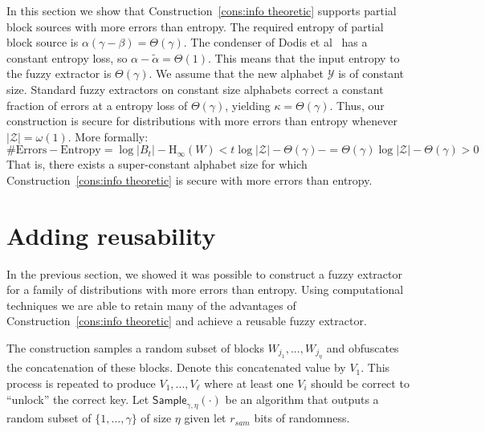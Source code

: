 \documentclass[11pt]{article}
\newcommand{\consref}[1]{\mbox{Construction~\ref{#1}}}
\newcommand{\class}[1]{{\ensuremath{\mathsf{#1}}}}
\newcommand{\sample}{\ensuremath{\class{Sample}}\xspace}
\newcommand{\Hoo}{\mathrm{H}_\infty}
\begin{document}
In this section we show that \consref{cons:info theoretic} supports partial block sources with more errors than entropy.  The required entropy of partial block source is $\alpha (\gamma-\beta ) = \Theta(\gamma)$.  The condenser of Dodis et al~\cite{dodis2014key} has a constant entropy loss, so $\alpha-\tilde{\alpha} = \Theta(1)$. This means that the input entropy to the fuzzy extractor is $\Theta(\gamma)$.   We assume that the new alphabet $\mathcal{Y}$ is of constant size.  Standard fuzzy extractors on constant size alphabets correct a constant fraction of errors at a entropy loss of $\Theta(\gamma)$, yielding $\kappa = \Theta(\gamma)$.  Thus, our construction is secure for distributions with more errors than entropy whenever $|\mathcal{Z}| = \omega(1)$.
More formally:
\[
\text{\# Errors} - \text{Entropy} = \log |B_t| - \Hoo(W) <  t \log |\mathcal{Z}| - \Theta(\gamma)-= \Theta(\gamma) \log |\mathcal{Z}| - \Theta(\gamma)  > 0
\]
That is, there exists a super-constant alphabet size for which \consref{cons:info theoretic} is secure with more errors than entropy.

\section{Adding reusability}
\label{sec:sampling}
In the previous section, we showed it was possible to construct a fuzzy extractor for a family of distributions with more errors than entropy.  Using computational techniques we are able to retain many of the advantages of \consref{cons:info theoretic} and achieve a reusable fuzzy extractor.  

The construction samples a random subset of blocks $W_{j_1},..., W_{j_\eta}$ and obfuscates the concatenation of these blocks.  Denote this concatenated value by $V_1$.  This process is repeated to produce $V_1,..., V_\ell$ where at least one $V_i$ should be correct to ``unlock'' the correct key.  
Let $\sample_{\gamma, \eta}(\cdot)$ be an algorithm that  outputs a random subset of $\{1,..., \gamma\}$ of size $\eta$ given let $r_{sam}$ bits of randomness.
\end{document}
